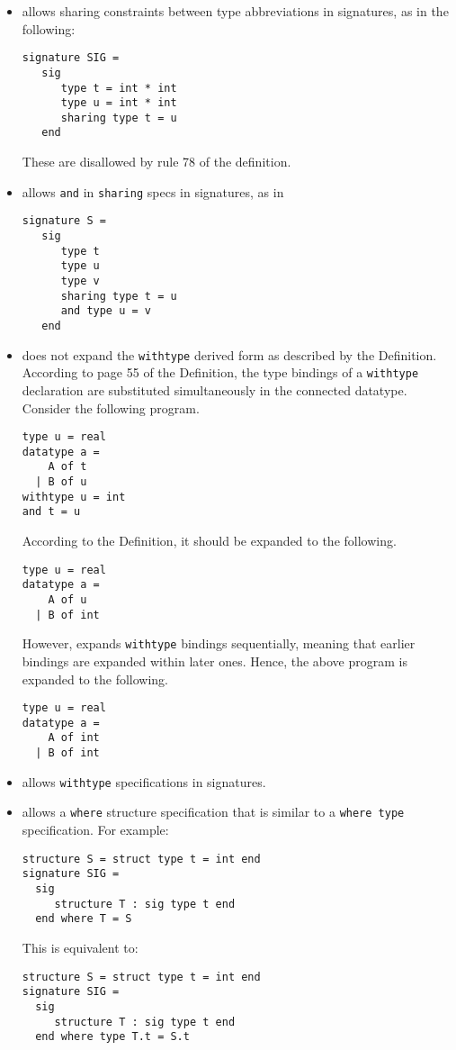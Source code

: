 \begin{itemize}
\item
{\smlnj} allows sharing constraints between type abbreviations in
signatures, as in the following:
\begin{verbatim}
signature SIG =
   sig
      type t = int * int
      type u = int * int
      sharing type t = u
   end
\end{verbatim}
These are disallowed by rule 78 of the definition.

\item
{\smlnj} allows {\tt and} in {\tt sharing} specs in signatures, as in
\begin{verbatim}
signature S =
   sig
      type t
      type u
      type v
      sharing type t = u
      and type u = v
   end
\end{verbatim}
%
\item
{\smlnj} does not expand the {\tt withtype} derived form as described by
the Definition.  According to page 55 of the Definition, the type
bindings of a {\tt withtype} declaration are substituted simultaneously
in the connected datatype.  Consider the following program.
\begin{verbatim}
type u = real
datatype a =
    A of t
  | B of u
withtype u = int
and t = u
\end{verbatim}
According to the Definition, it should be expanded to the following.
\begin{verbatim}
type u = real
datatype a =
    A of u
  | B of int
\end{verbatim}
However, {\smlnj} expands {\tt withtype} bindings sequentially, meaning
that earlier bindings are expanded within later ones.  Hence, the
above program is expanded to the following.
\begin{verbatim}
type u = real
datatype a =
    A of int
  | B of int
\end{verbatim}
%
\item
{\smlnj} allows {\tt withtype} specifications in signatures.

\item
{\smlnj} allows a {\tt where} structure specification that is similar
to a {\tt where type} specification.  For example:
\begin{verbatim}
structure S = struct type t = int end
signature SIG =
  sig
     structure T : sig type t end
  end where T = S
\end{verbatim}
This is equivalent to:
\begin{verbatim}
structure S = struct type t = int end
signature SIG =
  sig
     structure T : sig type t end
  end where type T.t = S.t
\end{verbatim}

\end{itemize}
